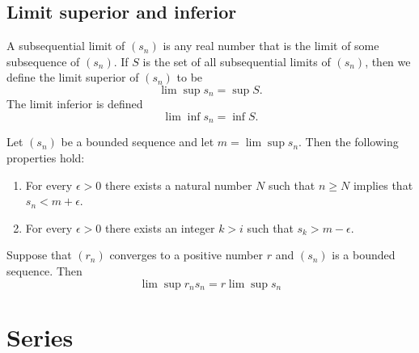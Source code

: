 \documentclass{article}
\begin{document}
\subsection{Limit superior and inferior}
\begin{definition}
	A subsequential limit of \((s_n)\) is any real number that is the limit of some subsequence of \((s_n)\). If \(S\) is the set of all subsequential limits of \((s_n)\), then we define the limit superior of \((s_n)\) to be
	\begin{equation*}
		\lim\sup s_n=\sup S.
	\end{equation*}
	The limit inferior is defined
	\begin{equation*}
		\lim\inf s_n=\inf S.
	\end{equation*}
\end{definition}
\begin{theorem}
	Let \((s_n)\) be a bounded sequence and let \(m=\lim\sup s_n\). Then the following properties hold:
	\begin{enumerate}
		\item For every \(\epsilon>0\) there exists a natural number \(N\) such that \(n\geq N\) implies that \(s_n<m+\epsilon\).
		\item For every \(\epsilon>0\) there exists an integer \(k>i\) such that \(s_k>m-\epsilon\).
	\end{enumerate}
\end{theorem}
\begin{theorem}
	Suppose that \((r_n)\) converges to a positive number \(r\) and \((s_n)\) is a bounded sequence. Then
	\begin{equation*}
		\lim\sup r_ns_n=r\lim\sup s_n
	\end{equation*}
\end{theorem}
\section{Series}
\end{document}
